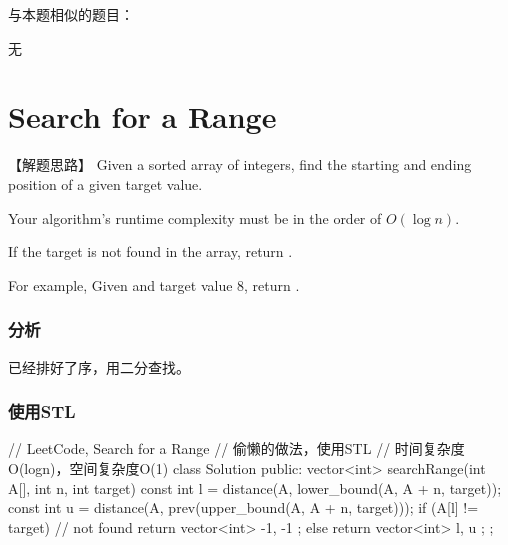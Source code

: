 与本题相似的题目：
\begindot
\item  无
\myenddot


\section{Search for a Range} %
\label{sec:search-for-a-range}


【解题思路】
Given a sorted array of integers, find the starting and ending position of a given target value.

Your algorithm's runtime complexity must be in the order of $O(\log n)$.

If the target is not found in the array, return \code{[-1, -1]}.

For example,
Given \code{[5, 7, 7, 8, 8, 10]} and target value 8,
return \code{[3, 4]}.


\subsubsection{分析}
已经排好了序，用二分查找。


\subsubsection{使用STL}
\begin{Code}
	// LeetCode, Search for a Range
	// 偷懒的做法，使用STL
	// 时间复杂度O(logn)，空间复杂度O(1)
	class Solution {
		public:
		vector<int> searchRange(int A[], int n, int target) {
			const int l = distance(A, lower_bound(A, A + n, target));
			const int u = distance(A, prev(upper_bound(A, A + n, target)));
			if (A[l] != target) // not found
			return vector<int> { -1, -1 };
			else
			return vector<int> { l, u };
		}
	};
\end{Code}


